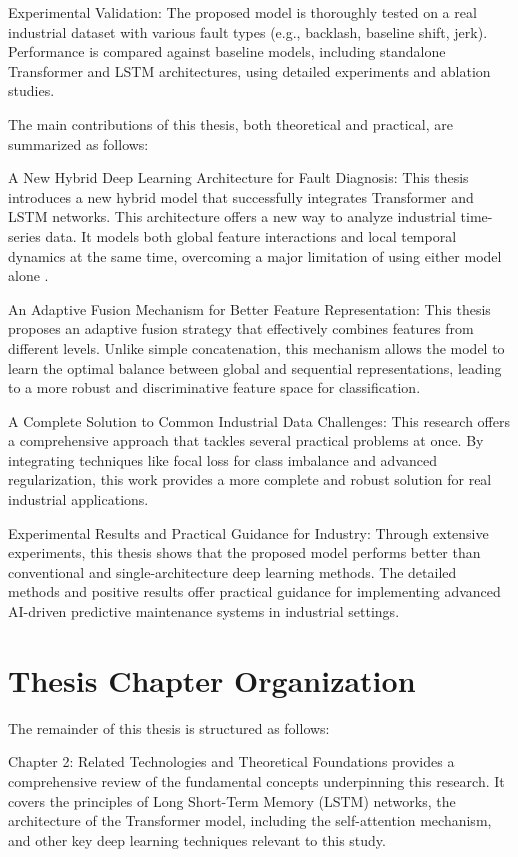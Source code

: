 Experimental Validation: The proposed model is thoroughly tested on a real industrial dataset with various fault types (e.g., backlash, baseline shift, jerk). Performance is compared against baseline models, including standalone Transformer and LSTM architectures, using detailed experiments and ablation studies.

The main contributions of this thesis, both theoretical and practical, are summarized as follows:

A New Hybrid Deep Learning Architecture for Fault Diagnosis: This thesis introduces a new hybrid model that successfully integrates Transformer and LSTM networks. This architecture offers a new way to analyze industrial time-series data. It models both global feature interactions and local temporal dynamics at the same time, overcoming a major limitation of using either model alone \cite{wen2021time}.

An Adaptive Fusion Mechanism for Better Feature Representation: This thesis proposes an adaptive fusion strategy that effectively combines features from different levels. Unlike simple concatenation, this mechanism allows the model to learn the optimal balance between global and sequential representations, leading to a more robust and discriminative feature space for classification.

A Complete Solution to Common Industrial Data Challenges: This research offers a comprehensive approach that tackles several practical problems at once. By integrating techniques like focal loss for class imbalance \cite{lin2017focal} and advanced regularization, this work provides a more complete and robust solution for real industrial applications.

Experimental Results and Practical Guidance for Industry: Through extensive experiments, this thesis shows that the proposed model performs better than conventional and single-architecture deep learning methods. The detailed methods and positive results offer practical guidance for implementing advanced AI-driven predictive maintenance systems in industrial settings.

\section{Thesis Chapter Organization}
\label{sec:introduction:organization}

The remainder of this thesis is structured as follows:

Chapter 2: Related Technologies and Theoretical Foundations provides a comprehensive review of the fundamental concepts underpinning this research. It covers the principles of Long Short-Term Memory (LSTM) networks, the architecture of the Transformer model, including the self-attention mechanism, and other key deep learning techniques relevant to this study.

